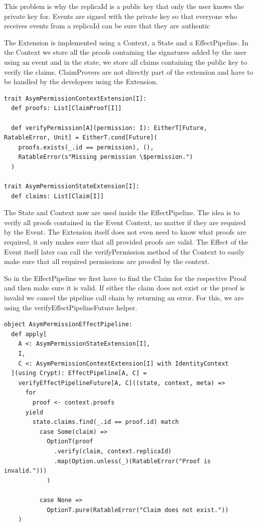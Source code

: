 \documentclass[
	ngerman,
	ruledheaders=section,   %
	class=report,		    %
	thesis={type=bachelor}, %
	accentcolor=9c,			%
	custommargins=true,    %
	marginpar=false,        %
	parskip=half-,          %
	fontsize=11pt,          %
]{tudapub}
\begin{document}
This problem is why the replicaId is a public key that only the user knows the private key for. Events are signed with the private key so that everyone who receives events from a replicaId can be sure that they are authentic

The Extension is implemented using a Context, a State and a EffectPipeline. In the Context we store all the proofs containing the signatures added by the user using an event and in the state, we store all claims containing the public key to verify the claims. ClaimProvers are not directly part of the extension and have to be handled by the developers using the Extension.

\begin{lstlisting}
trait AsymPermissionContextExtension[I]:
  def proofs: List[ClaimProof[I]]

  def verifyPermission[A](permission: I): EitherT[Future, RatableError, Unit] = EitherT.cond[Future](
    proofs.exists(_.id == permission), (),
    RatableError(s"Missing permission \$permission.")
  )

trait AsymPermissionStateExtension[I]:
  def claims: List[Claim[I]]
\end{lstlisting}

The State and Context now are used inside the EffectPipeline. The idea is to verify all proofs contained in the Event Context, no matter if they are required by the Event. The Extension itself does not even need to know what proofs are required, it only makes sure that all provided proofs are valid. The Effect of the Event itself later can call the verifyPermission method of the Context to easily make sure that all required permissions are proofed by the context.

So in the EffectPipeline we first have to find the Claim for the respective Proof and then make sure it is valid. If either the claim does not exist or the proof is invalid we cancel the pipeline call chain by returning an error. For this, we are using the verifyEffectPipelineFuture helper.

\begin{lstlisting}
object AsymPermissionEffectPipeline:
  def apply[
    A <: AsymPermissionStateExtension[I], 
    I, 
    C <: AsymPermissionContextExtension[I] with IdentityContext
  ](using Crypt): EffectPipeline[A, C] =
    verifyEffectPipelineFuture[A, C]((state, context, meta) =>
      for
        proof <- context.proofs
      yield
        state.claims.find(_.id == proof.id) match
          case Some(claim) => 
            OptionT(proof
              .verify(claim, context.replicaId)
              .map(Option.unless(_)(RatableError("Proof is invalid.")))
            )

          case None => 
            OptionT.pure(RatableError("Claim does not exist."))
    )
\end{lstlisting}
\end{document}
